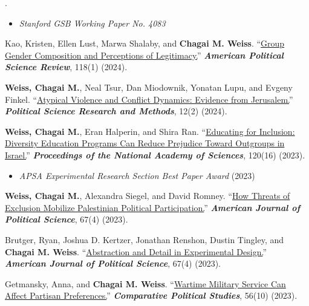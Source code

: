 \documentclass[11pt]{article}
\newcounter{cvpub}
\newenvironment{cvpubs}[1]
  {\setcounter{cvpub}{#1}\addtocounter{cvpub}{1}%
   \RaggedRight\interlinepenalty=150%
   \begin{list}{\addtocounter{cvpub}{-1}\arabic{cvpub}.}%
     {\setlength{\labelwidth}{1.85em}%
      \setlength{\labelsep}{0.45em}%
      \setlength{\leftmargin}{2.30em}%
      \setlength{\rightmargin}{0pt}%
      \setlength{\itemindent}{0pt}%
      \setlength{\listparindent}{0pt}%
      \setlength{\topsep}{0pt}%
      \setlength{\partopsep}{0pt}%
      \setlength{\parsep}{0pt}%
      \setlength{\itemsep}{5.5pt}%
      \renewcommand{\makelabel}[1]{\hfil##1}}}
  {\end{list}}
\newenvironment{cvnotes}[1][$\star$]
  {\begin{itemize}[#1,leftmargin=2.4em,labelsep=0.4em,
                   topsep=1.5pt,itemsep=0.5pt,parsep=0pt,partopsep=0pt]}
  {\end{itemize}}
\begin{document}
\begin{cvpubs}{18}
\begin{cvnotes}[$\bullet$]
    \item \emph{Stanford GSB Working Paper No. 4083}
\end{cvnotes}
\item Kao, Kristen, Ellen Lust, Marwa Shalaby, and \textbf{Chagai M. Weiss}. ``\href{https://www.cambridge.org/core/services/aop-cambridge-core/content/view/15DE6206F7E5D3D9707D590B81A40C58/S0003055423000357a.pdf/female_representation_and_legitimacy_evidence_from_a_harmonized_experiment_in_jordan_morocco_and_tunisia.pdf}{Group Gender Composition and Perceptions of Legitimacy.}'' \textbf{\emph{American Political Science Review}}, 118(1) (2024).
\item \textbf{Weiss, Chagai M.}, Neal Tsur, Dan Miodownik, Yonatan Lupu, and Evgeny Finkel. ``\href{https://www.cambridge.org/core/journals/political-science-research-and-methods/article/atypical-violence-and-conflict-dynamics-evidence-from-jerusalem/689731DDDA2C0B9C818911C86B472460}{Atypical Violence and Conflict Dynamics: Evidence from Jerusalem.}'' \textbf{\emph{Political Science Research and Methods}}, 12(2) (2024).
\item \textbf{Weiss, Chagai M.}, Eran Halperin, and Shira Ran. ``\href{https://www.pnas.org/doi/10.1073/pnas.2218621120}{Educating for Inclusion: Diversity Education Programs Can Reduce Prejudice Toward Outgroups in Israel.}'' \textbf{\emph{Proceedings of the National Academy of Sciences}}, 120(16) (2023).
\begin{cvnotes}
    \item \emph{APSA Experimental Research Section Best Paper Award} (2023)
\end{cvnotes}
\item \textbf{Weiss, Chagai M.}, Alexandra Siegel, and David Romney. ``\href{https://onlinelibrary.wiley.com/doi/full/10.1111/ajps.12718}{How Threats of Exclusion Mobilize Palestinian Political Participation.}'' \textbf{\emph{American Journal of Political Science}}, 67(4) (2023).
\item Brutger, Ryan, Joshua D. Kertzer, Jonathan Renshon, Dustin Tingley, and \textbf{Chagai M. Weiss}. ``\href{https://onlinelibrary.wiley.com/doi/full/10.1111/ajps.12710}{Abstraction and Detail in Experimental Design.}'' \textbf{\emph{American Journal of Political Science}}, 67(4) (2023).
\item Getmansky, Anna, and \textbf{Chagai M. Weiss}. ``\href{https://journals.sagepub.com/doi/10.1177/00104140221141837}{Wartime Military Service Can Affect Partisan Preferences.}'' \textbf{\emph{Comparative Political Studies}}, 56(10) (2023).

\end{cvpubs}
\end{document}
